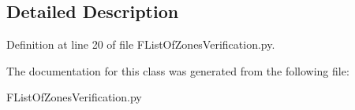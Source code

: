 \subsection{Detailed Description}


Definition at line 20 of file F\+List\+Of\+Zones\+Verification.\+py.



The documentation for this class was generated from the following file\+:\begin{DoxyCompactItemize}
\item 
F\+List\+Of\+Zones\+Verification.\+py\end{DoxyCompactItemize}
